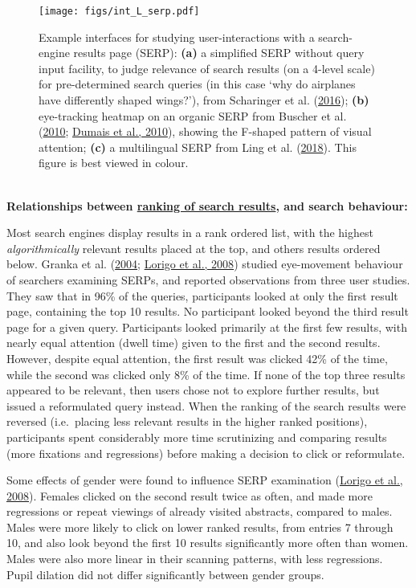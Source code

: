 \documentclass[a4paper, nobind]{templates/ociamthesis}
\begin{document}
\begin{figure}
\hypertarget{fig_int_L_serp}{%
\centering
\texttt{[image: figs/int\_L\_serp.pdf]}
\caption{Example interfaces for studying user-interactions with a
search-engine results page (SERP): \textbf{(a)} a simplified SERP without
query input facility, to judge relevance of search results (on a 4-level
scale) for pre-determined search queries (in this case `why do airplanes
have differently shaped wings?'), from Scharinger et al. (\protect\hyperlink{ref-63}{2016}); \textbf{(b)} eye-tracking heatmap
on an organic SERP from Buscher et al. (\protect\hyperlink{ref-115}{2010}; \protect\hyperlink{ref-117}{Dumais et al., 2010}), showing the F-shaped pattern of
visual attention; \textbf{(c)} a multilingual SERP from Ling et al. (\protect\hyperlink{ref-132}{2018}). This figure is
best viewed in colour.}\label{fig_int_L_serp}
}
\end{figure}

~\\
\textbf{Relationships between \uline{ranking of search results}, and
search behaviour:}

Most search engines display results in a rank ordered list, with the
highest \emph{algorithmically} relevant results placed at the top, and others
results ordered below. Granka et al. (\protect\hyperlink{ref-101}{2004}; \protect\hyperlink{ref-108}{Lorigo et al., 2008}) studied eye-movement behaviour of
searchers examining SERPs, and reported observations from three user
studies. They saw that in 96\% of the queries, participants looked at
only the first result page, containing the top 10 results. No
participant looked beyond the third result page for a given query.
Participants looked primarily at the first few results, with nearly
equal attention (dwell time) given to the first and the second results.
However, despite equal attention, the first result was clicked 42\% of
the time, while the second was clicked only 8\% of the time. If none of
the top three results appeared to be relevant, then users chose not to
explore further results, but issued a reformulated query instead. When
the ranking of the search results were reversed (i.e.~placing less
relevant results in the higher ranked positions), participants spent
considerably more time scrutinizing and comparing results (more
fixations and regressions) before making a decision to click or
reformulate.

Some effects of gender were found to influence SERP examination (\protect\hyperlink{ref-108}{Lorigo et al., 2008}).
Females clicked on the second result twice as often, and made more
regressions or repeat viewings of already visited abstracts, compared to
males. Males were more likely to click on lower ranked results, from
entries 7 through 10, and also look beyond the first 10 results
significantly more often than women. Males were also more linear in
their scanning patterns, with less regressions. Pupil dilation did not
differ significantly between gender groups.
\end{document}
